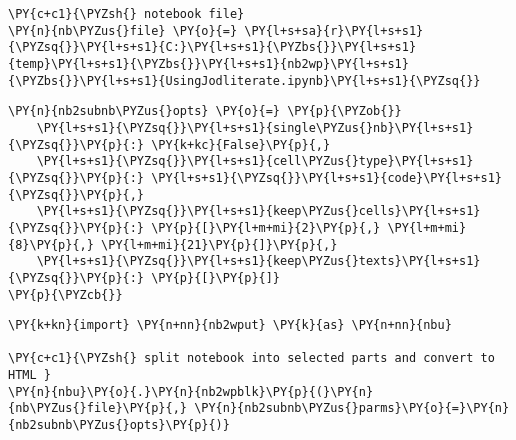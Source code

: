     \begin{tcolorbox}[breakable, size=fbox, boxrule=1pt, pad at break*=1mm,colback=cellbackground, colframe=cellborder]
\begin{Verbatim}[commandchars=\\\{\}]
\PY{c+c1}{\PYZsh{} notebook file}
\PY{n}{nb\PYZus{}file} \PY{o}{=} \PY{l+s+sa}{r}\PY{l+s+s1}{\PYZsq{}}\PY{l+s+s1}{C:}\PY{l+s+s1}{\PYZbs{}}\PY{l+s+s1}{temp}\PY{l+s+s1}{\PYZbs{}}\PY{l+s+s1}{nb2wp}\PY{l+s+s1}{\PYZbs{}}\PY{l+s+s1}{UsingJodliterate.ipynb}\PY{l+s+s1}{\PYZsq{}}
\end{Verbatim}
\end{tcolorbox}

    \begin{tcolorbox}[breakable, size=fbox, boxrule=1pt, pad at break*=1mm,colback=cellbackground, colframe=cellborder]
\begin{Verbatim}[commandchars=\\\{\}]
\PY{n}{nb2subnb\PYZus{}opts} \PY{o}{=} \PY{p}{\PYZob{}}
    \PY{l+s+s1}{\PYZsq{}}\PY{l+s+s1}{single\PYZus{}nb}\PY{l+s+s1}{\PYZsq{}}\PY{p}{:} \PY{k+kc}{False}\PY{p}{,}
    \PY{l+s+s1}{\PYZsq{}}\PY{l+s+s1}{cell\PYZus{}type}\PY{l+s+s1}{\PYZsq{}}\PY{p}{:} \PY{l+s+s1}{\PYZsq{}}\PY{l+s+s1}{code}\PY{l+s+s1}{\PYZsq{}}\PY{p}{,}
    \PY{l+s+s1}{\PYZsq{}}\PY{l+s+s1}{keep\PYZus{}cells}\PY{l+s+s1}{\PYZsq{}}\PY{p}{:} \PY{p}{[}\PY{l+m+mi}{2}\PY{p}{,} \PY{l+m+mi}{8}\PY{p}{,} \PY{l+m+mi}{21}\PY{p}{]}\PY{p}{,}
    \PY{l+s+s1}{\PYZsq{}}\PY{l+s+s1}{keep\PYZus{}texts}\PY{l+s+s1}{\PYZsq{}}\PY{p}{:} \PY{p}{[}\PY{p}{]}
\PY{p}{\PYZcb{}}
\end{Verbatim}
\end{tcolorbox}

    \begin{tcolorbox}[breakable, size=fbox, boxrule=1pt, pad at break*=1mm,colback=cellbackground, colframe=cellborder]
\begin{Verbatim}[commandchars=\\\{\}]
\PY{k+kn}{import} \PY{n+nn}{nb2wput} \PY{k}{as} \PY{n+nn}{nbu}

\PY{c+c1}{\PYZsh{} split notebook into selected parts and convert to HTML }
\PY{n}{nbu}\PY{o}{.}\PY{n}{nb2wpblk}\PY{p}{(}\PY{n}{nb\PYZus{}file}\PY{p}{,} \PY{n}{nb2subnb\PYZus{}parms}\PY{o}{=}\PY{n}{nb2subnb\PYZus{}opts}\PY{p}{)}
\end{Verbatim}
\end{tcolorbox}

